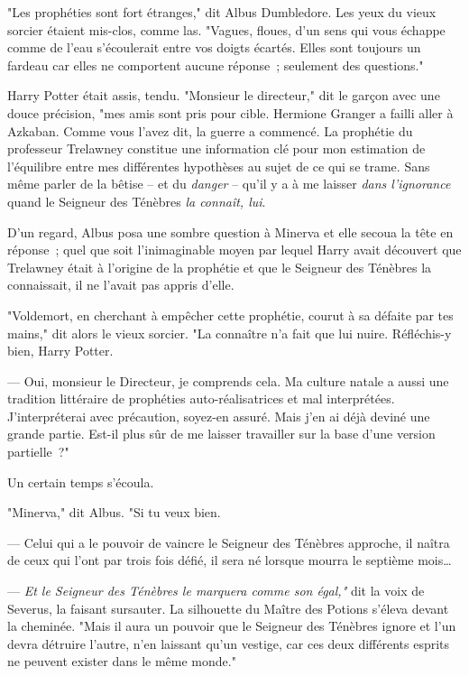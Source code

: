 "Les prophéties sont fort étranges," dit Albus Dumbledore. Les yeux du vieux sorcier étaient mis-clos, comme las. "Vagues, floues, d'un sens qui vous échappe comme de l'eau s'écoulerait entre vos doigts écartés. Elles sont toujours un fardeau car elles ne comportent aucune réponse~; seulement des questions."

Harry Potter était assis, tendu. "Monsieur le directeur," dit le garçon avec une douce précision, "mes amis sont pris pour cible. Hermione Granger a failli aller à Azkaban. Comme vous l'avez dit, la guerre a commencé. La prophétie du professeur Trelawney constitue une information clé pour mon estimation de l'équilibre entre mes différentes hypothèses au sujet de ce qui se trame. Sans même parler de la bêtise -- et du \emph{danger} -- qu'il y a à me laisser \emph{dans l'ignorance} quand le Seigneur des Ténèbres \emph{la connaît, lui}.

D'un regard, Albus posa une sombre question à Minerva et elle secoua la tête en réponse~; quel que soit l'inimaginable moyen par lequel Harry avait découvert que Trelawney était à l'origine de la prophétie et que le Seigneur des Ténèbres la connaissait, il ne l'avait pas appris d'elle.

"Voldemort, en cherchant à empêcher cette prophétie, courut à sa défaite par tes mains," dit alors le vieux sorcier. "La connaître n'a fait que lui nuire. Réfléchis-y bien, Harry Potter.

--- Oui, monsieur le Directeur, je comprends cela. Ma culture natale a aussi une tradition littéraire de prophéties auto-réalisatrices et mal interprétées. J'interpréterai avec précaution, soyez-en assuré. Mais j'en ai déjà deviné une grande partie. Est-il plus sûr de me laisser travailler sur la base d'une version partielle~?"

Un certain temps s'écoula.

"Minerva," dit Albus. "Si tu veux bien.

--- Celui qui a le pouvoir de vaincre le Seigneur des Ténèbres approche, il naîtra de ceux qui l'ont par trois fois défié, il sera né lorsque mourra le septième mois…

--- \emph{Et le Seigneur des Ténèbres le marquera comme son égal,"} dit la voix de Severus, la faisant sursauter. La silhouette du Maître des Potions s'éleva devant la cheminée. "Mais il aura un pouvoir que le Seigneur des Ténèbres ignore et l'un devra détruire l'autre, n'en laissant qu'un vestige, car ces deux différents esprits ne peuvent exister dans le même monde."

